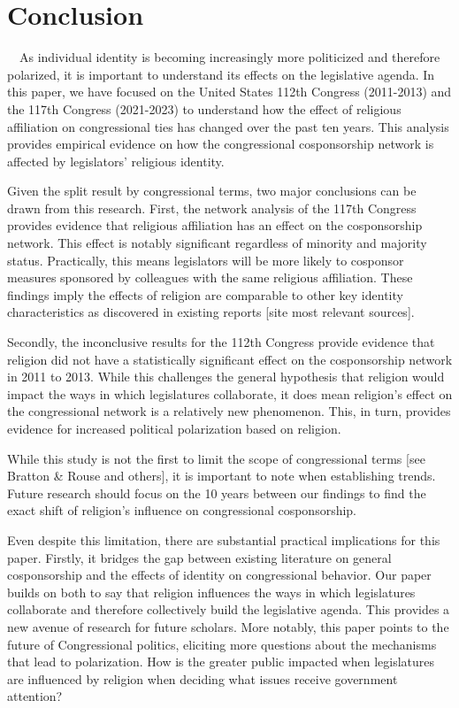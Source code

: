 \documentclass[Royal,times,sageh]{sagej}
\begin{document}
\hypertarget{conclusion}{%
\section{Conclusion}\label{conclusion}}

~~As individual identity is becoming increasingly more politicized and
therefore polarized, it is important to understand its effects on the
legislative agenda. In this paper, we have focused on the United States
112th Congress (2011-2013) and the 117th Congress (2021-2023) to
understand how the effect of religious affiliation on congressional ties
has changed over the past ten years. This analysis provides empirical
evidence on how the congressional cosponsorship network is affected by
legislators' religious identity.

Given the split result by congressional terms, two major conclusions can
be drawn from this research. First, the network analysis of the 117th
Congress provides evidence that religious affiliation has an effect on
the cosponsorship network. This effect is notably significant regardless
of minority and majority status. Practically, this means legislators
will be more likely to cosponsor measures sponsored by colleagues with
the same religious affiliation. These findings imply the effects of
religion are comparable to other key identity characteristics as
discovered in existing reports {[}site most relevant sources{]}.

Secondly, the inconclusive results for the 112th Congress provide
evidence that religion did not have a statistically significant effect
on the cosponsorship network in 2011 to 2013. While this challenges the
general hypothesis that religion would impact the ways in which
legislatures collaborate, it does mean religion's effect on the
congressional network is a relatively new phenomenon. This, in turn,
provides evidence for increased political polarization based on
religion.

While this study is not the first to limit the scope of congressional
terms {[}see Bratton \& Rouse and others{]}, it is important to note
when establishing trends. Future research should focus on the 10 years
between our findings to find the exact shift of religion's influence on
congressional cosponsorship.

Even despite this limitation, there are substantial practical
implications for this paper. Firstly, it bridges the gap between
existing literature on general cosponsorship and the effects of identity
on congressional behavior. Our paper builds on both to say that religion
influences the ways in which legislatures collaborate and therefore
collectively build the legislative agenda. This provides a new avenue of
research for future scholars. More notably, this paper points to the
future of Congressional politics, eliciting more questions about the
mechanisms that lead to polarization. How is the greater public impacted
when legislatures are influenced by religion when deciding what issues
receive government attention?
\end{document}
